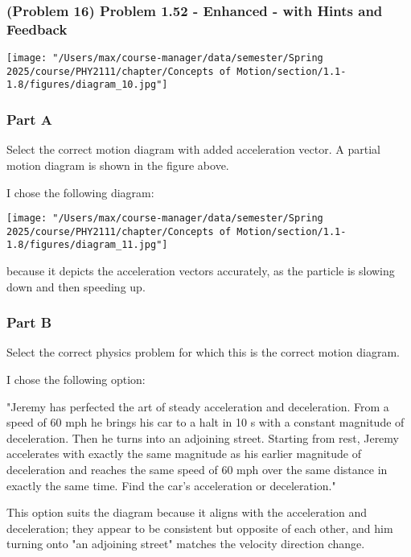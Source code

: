 \newpage

\subsubsection{(Problem 16) Problem 1.52 - Enhanced - with Hints and Feedback}

\begin{center}
	\texttt{[image: "/Users/max/course-manager/data/semester/Spring 2025/course/PHY2111/chapter/Concepts of Motion/section/1.1-1.8/figures/diagram\_10.jpg"]}
\end{center}

\subsubsection{Part A}

Select the correct motion diagram with added acceleration vector. A partial motion diagram is shown in the figure above.

\vspace{1em}

\begin{solution}
	I chose the following diagram:
	\begin{center}
		\texttt{[image: "/Users/max/course-manager/data/semester/Spring 2025/course/PHY2111/chapter/Concepts of Motion/section/1.1-1.8/figures/diagram\_11.jpg"]}
	\end{center}
	because it depicts the acceleration vectors accurately, as the particle is slowing down and then speeding up.
\end{solution}

\subsubsection{Part B}

Select the correct physics problem for which this is the correct motion diagram.

\vspace{1em}

\begin{solution}
	I chose the following option:

	"Jeremy has perfected the art of steady acceleration and deceleration. From a speed of 60 mph  he brings his car to a halt in 10 s with a constant magnitude of deceleration. Then he turns into an adjoining street. Starting from rest, Jeremy accelerates with exactly the same magnitude as his earlier magnitude of deceleration and reaches the same speed of 60 mph over the same distance in exactly the same time. Find the car's acceleration or deceleration."

	This option suits the diagram because it aligns with the acceleration and deceleration; they appear to be consistent but opposite of each other, and him turning onto "an adjoining street" matches the velocity direction change.
\end{solution}

